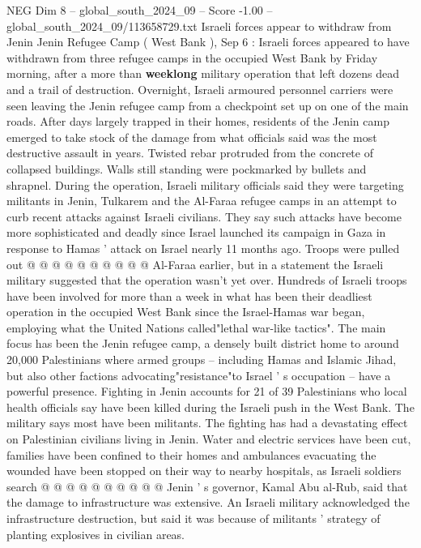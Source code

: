 \begin{textsample}{NEG Dim 8 – global\_south\_2024\_09 – Score -1.00 – global\_south\_2024\_09/113658729.txt}  \label{ex:f8_neg_165}
Israeli forces appear to withdraw from Jenin Jenin Refugee Camp ( West Bank ), Sep 6 : Israeli forces appeared to have withdrawn from three refugee camps in the occupied West Bank by Friday morning, after a more than \textbf{weeklong} military operation that left dozens dead and a trail of destruction.
Overnight, Israeli armoured personnel carriers were seen leaving the Jenin refugee camp from a checkpoint set up on one of the main roads.
After days largely trapped in their homes, residents of the Jenin camp emerged to take stock of the damage from what officials said was the most destructive assault in years.
Twisted rebar protruded from the concrete of collapsed buildings.
Walls still standing were pockmarked by bullets and shrapnel.
During the operation, Israeli military officials said they were targeting militants in Jenin, Tulkarem and the Al-Faraa refugee camps in an attempt to curb recent attacks against Israeli civilians.
They say such attacks have become more sophisticated and deadly since Israel launched its campaign in Gaza in response to Hamas ' attack on Israel nearly 11 months ago.
Troops were pulled out @ @ @ @ @ @ @ @ @ @ Al-Faraa earlier, but in a statement the Israeli military suggested that the operation wasn't yet over.
Hundreds of Israeli troops have been involved for more than a week in what has been their deadliest operation in the occupied West Bank since the Israel-Hamas war began, employing what the United Nations called"lethal war-like tactics".
The main focus has been the Jenin refugee camp, a densely built district home to around 20,000 Palestinians where armed groups -- including Hamas and Islamic Jihad, but also other factions advocating"resistance"to Israel ' s occupation -- have a powerful presence.
Fighting in Jenin accounts for 21 of 39 Palestinians who local health officials say have been killed during the Israeli push in the West Bank.
The military says most have been militants.
The fighting has had a devastating effect on Palestinian civilians living in Jenin.
Water and electric services have been cut, families have been confined to their homes and ambulances evacuating the wounded have been stopped on their way to nearby hospitals, as Israeli soldiers search @ @ @ @ @ @ @ @ @ @ Jenin ' s governor, Kamal Abu al-Rub, said that the damage to infrastructure was extensive.
An Israeli military acknowledged the infrastructure destruction, but said it was because of militants ' strategy of planting explosives in civilian areas.

\end{textsample}
